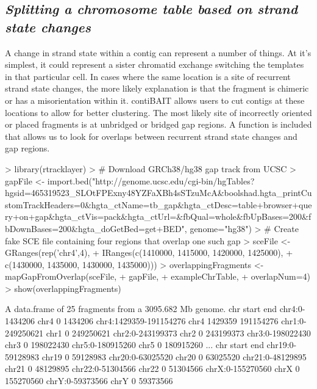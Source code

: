\documentclass{article}
\begin{document}
\subsection{\textit{Splitting a chromosome table based on strand state changes}}
A change in strand state within a contig can represent a number of things. At it's simplest, it could represent a sister chromatid exchange switching the templates in that particular cell. In cases where the same location is a site of recurrent strand state changes, the more likely explanation is that the fragment is chimeric or has a misorientation within it. contiBAIT allows users to cut contigs at these locations to allow for better clustering. The most likely site of incorrectly oriented or placed fragments is at unbridged or bridged gap regions. A function is included that allows us to look for overlaps between recurrent strand state changes and gap regions.

\begin{Schunk}
\begin{Sinput}
> library(rtracklayer)
> # Download GRCh38/hg38 gap track from UCSC
> gapFile <- import.bed("http://genome.ucsc.edu/cgi-bin/hgTables?hgsid=465319523_SLOtFPExny48YZFaXBh4sSTzuMcA&boolshad.hgta_printCustomTrackHeaders=0&hgta_ctName=tb_gap&hgta_ctDesc=table+browser+query+on+gap&hgta_ctVis=pack&hgta_ctUrl=&fbQual=whole&fbUpBases=200&fbDownBases=200&hgta_doGetBed=get+BED", genome="hg38")
> # Create fake SCE file containing four regions that overlap one such gap
> sceFile <- GRanges(rep('chr4',4), 
+ IRanges(c(1410000, 1415000, 1420000, 1425000), 
+ c(1430000, 1435000, 1430000, 1435000)))
> overlappingFragments <- mapGapFromOverlap(sceFile,
+  gapFile, 
+  exampleChrTable, 
+  overlapNum=4)
> show(overlappingFragments)
\end{Sinput}
\begin{Soutput}
A data.frame of 25 fragments from a 3095.682 Mb genome.
                        chr   start       end
chr4:0-1434206         chr4       0   1434206
chr4:1429359-191154276 chr4 1429359 191154276
chr1:0-249250621       chr1       0 249250621
chr2:0-243199373       chr2       0 243199373
chr3:0-198022430       chr3       0 198022430
chr5:0-180915260       chr5       0 180915260
...
                   chr start       end
chr19:0-59128983 chr19     0  59128983
chr20:0-63025520 chr20     0  63025520
chr21:0-48129895 chr21     0  48129895
chr22:0-51304566 chr22     0  51304566
chrX:0-155270560  chrX     0 155270560
chrY:0-59373566   chrY     0  59373566
\end{Soutput}
\end{Schunk}
\end{document}
